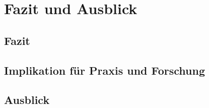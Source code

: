 \section{Fazit und Ausblick}
\subsection{Fazit}
\subsection{Implikation für Praxis und Forschung}
\subsection{Ausblick}
